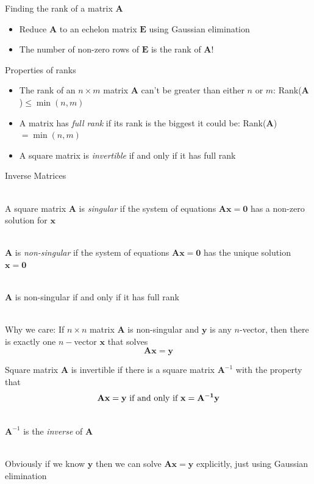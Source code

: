 \documentclass[10pt]{seminar}
\begin{document}
\begin{slide}
\newslide

Finding the rank of a matrix $\mathbf{A}$

\begin{itemize}
\item Reduce $\mathbf{A}$ to an echelon matrix $\mathbf{E}$ using Gaussian elimination
\item The number of non-zero rows of $\mathbf{E}$ is the rank of $\mathbf{A}$!
\end{itemize}

\vspace{.3in}
Properties of ranks

\begin{itemize}
\item The rank of an $n\times m$ matrix  $\mathbf{A}$ can't be greater than either $n$ or $m$: Rank($\mathbf{A}$)$\leq \min (n, m)$
\item A matrix has \textit{full rank} if its rank is the biggest it could be: Rank($\mathbf{A}$)$= \min (n, m)$
\item A square matrix is \textit{invertible} if and only if it has full rank
\end{itemize}

\newslide

Inverse Matrices

\ \\A square matrix $\mathbf{A}$ is \textit{singular} if the system of equations $\mathbf{Ax=0}$ has a non-zero solution for $\mathbf{x}$

\ \\$\mathbf{A}$ is \textit{non-singular} if the system of equations $\mathbf{Ax=0}$ has the unique solution $\mathbf{x=0}$

\ \\$\mathbf{A}$ is non-singular if and only if it has full rank

\ \\Why we care: If $n\times n$ matrix $\mathbf{A}$ is non-singular and $\mathbf{y}$ is any $n$-vector, then there is exactly one $n-$vector $\mathbf{x}$ that solves $$\mathbf{Ax=y}$$

\newslide
Square matrix $\mathbf{A}$ is invertible if there is a square matrix $\mathbf{A}^{-1}$ with the property that $$\mathbf{Ax=y} \hbox{ if and only if }\mathbf{x=A^{-1}y}$$

\ \\$\mathbf{A}^{-1}$ is the \textit{inverse} of $\mathbf{A}$

\ \\Obviously if we know $\mathbf{y}$ then we can solve $\mathbf{Ax=y}$ explicitly, just using Gaussian elimination


\end{slide}
\end{document}
